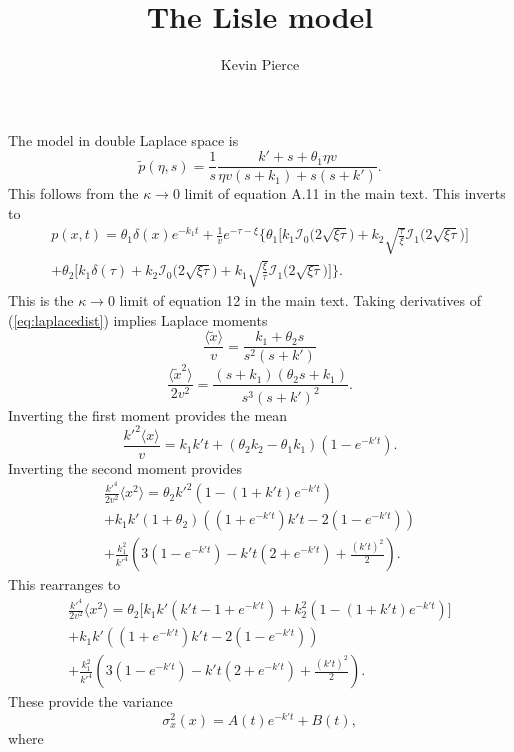 \documentclass[11pt]{article}
\newcommand\be{\begin{equation}} %
\newcommand\ee{\end{equation}}   %
\newcommand\bra{\langle}
\newcommand\ket{\rangle}
\newcommand\tp{\tilde{p}}
\begin{document}
\title{The Lisle model}
\author{Kevin Pierce}
\maketitle

The \citet{Lisle1998} model in double Laplace space is 
\be \tp(\eta,s) = \frac{1}{s} \frac{k'+s + \theta_1\eta v}{\eta v(s+k_1) + s(s+k')}. \label{eq:laplacedist} \ee
This follows from the $\kappa \rightarrow 0$ limit of equation A.11 in the main text.
This inverts to 
\begin{multline} p(x,t) = \theta_1\delta(x) e^{-k_1t}+\frac{1}{v}e^{-\tau-\xi}\Big\{\theta_1\Big[k_1 \mathcal{I}_0\Big(2\sqrt{\xi\tau}\Big) + k_2\sqrt{\frac{\tau}{\xi}}\mathcal{I}_1\Big(2\sqrt{\xi\tau}\Big)\Big] \\
+ \theta_2\Big[k_1\delta(\tau) + k_2 \mathcal{I}_0\Big(2\sqrt{\xi\tau}\Big) + k_1\sqrt{\frac{\xi}{\tau}}\mathcal{I}_1\Big(2\sqrt{\xi\tau}\Big)\Big] \Big\}.
\end{multline}
This is the $\kappa \rightarrow 0$ limit of equation 12 in the main text.
Taking derivatives of (\ref{eq:laplacedist}) implies Laplace moments
\be \frac{\bra \tilde{x}\ket}{v} = \frac{k_1 + \theta_2 s}{s^2(s+k')}\ee 
\be \frac{\bra \tilde{x}^2\ket}{2v^2} = \frac{(s+k_1)(\theta_2 s+k_1)}{s^3(s+k')^2}.\ee 
Inverting the first moment provides the mean 
\be \frac{k'^2 \bra x \ket}{v} = k_1 k' t + (\theta_2 k_2 - \theta_1 k_1)(1-e^{-k't}).\ee
Inverting the second moment provides
\begin{multline}
\frac{k'^4}{2v^2}\bra x^2 \ket = \theta_2 k'^2(1-(1+k't)e^{-k't}) \\ + k_1k'(1+\theta_2)((1+e^{-k't})k't-2(1-e^{-k't})) \\+ \frac{k_1^2}{k'^4}(3(1-e^{-k't})-k't(2+e^{-k't})+\frac{(k't)^2}{2}).
\end{multline}
This rearranges to 
\begin{multline}
\frac{k'^4}{2v^2}\bra x^2 \ket 
= \theta_2 \Big[k_1k'(k't-1+e^{-k't}) + k_2^2(1-(1+k't)e^{-k't})\Big] \\
+ k_1k'((1+e^{-k't})k't-2(1-e^{-k't})) \\+ \frac{k_1^2}{k'^4}(3(1-e^{-k't})-k't(2+e^{-k't})+\frac{(k't)^2}{2}).
\end{multline}
These provide the variance
\be \sigma_x^2(x) = A(t)e^{-k't} + B(t), \ee
where 

\end{document}
